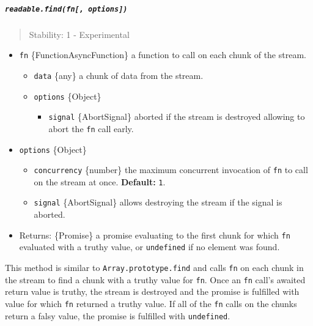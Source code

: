 \subparagraph{\texorpdfstring{\texttt{readable.find(fn{[},\ options{]})}}{readable.find(fn{[}, options{]})}}\label{readable.findfn-options}

\begin{quote}
Stability: 1 - Experimental
\end{quote}

\begin{itemize}
\tightlist
\item
  \texttt{fn} \{Function\textbar AsyncFunction\} a function to call on
  each chunk of the stream.

  \begin{itemize}
  \tightlist
  \item
    \texttt{data} \{any\} a chunk of data from the stream.
  \item
    \texttt{options} \{Object\}

    \begin{itemize}
    \tightlist
    \item
      \texttt{signal} \{AbortSignal\} aborted if the stream is destroyed
      allowing to abort the \texttt{fn} call early.
    \end{itemize}
  \end{itemize}
\item
  \texttt{options} \{Object\}

  \begin{itemize}
  \tightlist
  \item
    \texttt{concurrency} \{number\} the maximum concurrent invocation of
    \texttt{fn} to call on the stream at once. \textbf{Default:}
    \texttt{1}.
  \item
    \texttt{signal} \{AbortSignal\} allows destroying the stream if the
    signal is aborted.
  \end{itemize}
\item
  Returns: \{Promise\} a promise evaluating to the first chunk for which
  \texttt{fn} evaluated with a truthy value, or \texttt{undefined} if no
  element was found.
\end{itemize}

This method is similar to \texttt{Array.prototype.find} and calls
\texttt{fn} on each chunk in the stream to find a chunk with a truthy
value for \texttt{fn}. Once an \texttt{fn} call's awaited return value
is truthy, the stream is destroyed and the promise is fulfilled with
value for which \texttt{fn} returned a truthy value. If all of the
\texttt{fn} calls on the chunks return a falsy value, the promise is
fulfilled with \texttt{undefined}.

